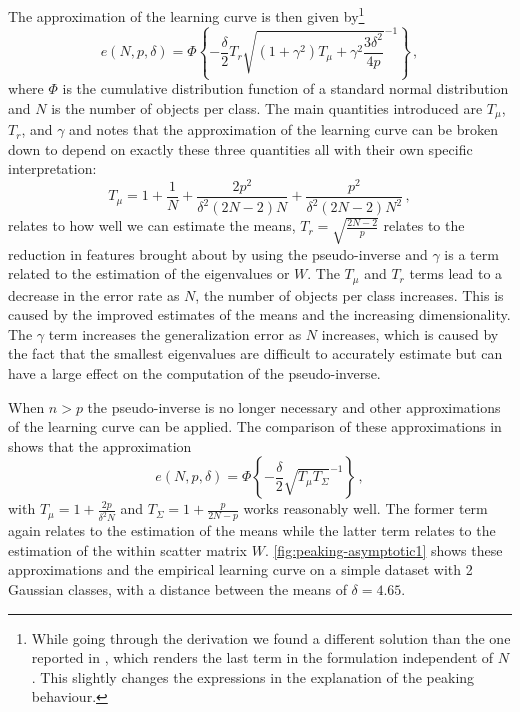\documentclass[runningheads,a4paper]{llncs}\usepackage[]{graphicx}\usepackage[]{color}
\begin{document}
The approximation of the learning curve is then given by\footnote{While going through the derivation we found a different solution than the one reported in \cite{Raudys1998}, which renders the last term in the formulation independent of $N$. This slightly changes the expressions in the explanation of the peaking behaviour.}
$$e(N,p,\delta) = \Phi \left\{ - \frac{\delta}{2} T_r \sqrt{(1+\gamma^2)T_\mu+\gamma^2 \frac{3 \delta^2}{4 p}}^{-1}\right\} \,,$$
where $\Phi$ is the cumulative distribution function of a standard normal distribution and $N$ is the number of objects per class.  The main quantities introduced are $T_\mu$, $T_r$, and $\gamma$ and \cite{Raudys1998} notes that the approximation of the learning curve can be broken down to depend on exactly these three quantities all with their own specific interpretation:
$$T_\mu=1+ \frac{1}{N} + \frac{2 p^2}{\delta^2 (2N-2) N}+\frac{p^2}{\delta^2 (2N-2) N^2}\,,$$
relates to how well we can estimate the means, $T_r=\sqrt{\frac{2 N-2}{p}}$ relates to the reduction in features brought about by using the pseudo-inverse and $\gamma$ is a term related to the estimation of the eigenvalues or $W$.  The $T_\mu$ and $T_r$ terms lead to a decrease in the error rate as $N$, the number of objects per class increases. This is caused by the improved estimates of the means and the increasing dimensionality. The $\gamma$ term increases the generalization error as $N$ increases, which is caused by the fact that the smallest eigenvalues are difficult to accurately estimate but can have a large effect on the computation of the pseudo-inverse.

When $n>p$ the pseudo-inverse is no longer necessary and other approximations of the learning curve can be applied. The comparison of these approximations in \cite{Wyman1990} shows that the approximation
$$
e(N,p,\delta) = \Phi \left\{ - \frac{\delta}{2}  \sqrt{T_\mu T_\Sigma}^{-1}\right\} \,,
$$
with $T_\mu=1+\frac{2 p}{\delta^2 N}$ and $T_\Sigma=1+\frac{p}{2 N - p}$ works reasonably well. The former term again relates to the estimation of the means while the latter term relates to the estimation of the within scatter matrix $W$.  \cref{fig:peaking-asymptotic1} shows these approximations and the empirical learning curve on a simple dataset with 2 Gaussian classes, with a distance between the means of $\delta=4.65$.
\end{document}
